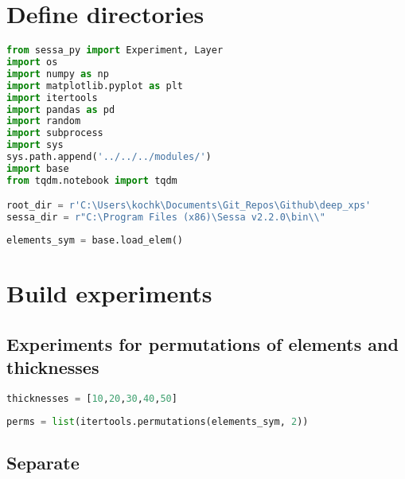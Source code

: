 \hypertarget{define-directories}{%
\section*{Define directories}\label{define-directories}}

\begin{lstlisting}[language=Python]
from sessa_py import Experiment, Layer
import os
import numpy as np
import matplotlib.pyplot as plt
import itertools
import pandas as pd
import random
import subprocess
import sys
sys.path.append('../../../modules/')
import base
from tqdm.notebook import tqdm

root_dir = r'C:\Users\kochk\Documents\Git_Repos\Github\deep_xps'
sessa_dir = r"C:\Program Files (x86)\Sessa v2.2.0\bin\\"
\end{lstlisting}

\begin{lstlisting}[language=Python]
elements_sym = base.load_elem()
\end{lstlisting}

\hypertarget{build-experiments}{%
\section*{Build experiments}\label{build-experiments}}

\hypertarget{experiments-for-permutations-of-elements-and-thicknesses}{%
\subsection*{Experiments for permutations of elements and
thicknesses}\label{experiments-for-permutations-of-elements-and-thicknesses}}

\begin{lstlisting}[language=Python]
thicknesses = [10,20,30,40,50]
\end{lstlisting}

\begin{lstlisting}[language=Python]
perms = list(itertools.permutations(elements_sym, 2))
\end{lstlisting}

\hypertarget{separate}{%
\subsection*{Separate}\label{separate}}

